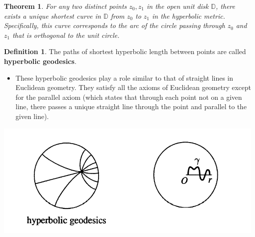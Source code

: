 \documentclass[
]{book}
\providecommand{\tightlist}{%
  \setlength{\itemsep}{0pt}\setlength{\parskip}{0pt}}
\newtheorem{theorem}{Theorem}[chapter]
\theoremstyle{definition}
\newtheorem{definition}{Definition}[chapter]
\theoremstyle{definition}
\theoremstyle{definition}
\theoremstyle{definition}
\theoremstyle{remark}
\begin{document}
\begin{theorem}
\protect\hypertarget{thm:unnamed-chunk-37}{}\label{thm:unnamed-chunk-37}For any two distinct points \(z_0, z_1\) in the open unit disk \(\mathbb{D}\), there exists a unique shortest curve in \(\mathbb{D}\) from \(z_0\) to \(z_1\) in the hyperbolic metric. Specifically, this curve corresponds to the arc of the circle passing through \(z_0\) and \(z_1\) that is orthogonal to the unit circle.
\end{theorem}

\begin{definition}
\protect\hypertarget{def:unnamed-chunk-38}{}\label{def:unnamed-chunk-38}The paths of shortest hyperbolic length between points are called \textbf{hyperbolic geodesics}.
\end{definition}

\begin{itemize}
\tightlist
\item
  These hyperbolic geodesics play a role similar to that of straight lines in Euclidean geometry. They satisfy all the axioms of Euclidean geometry except for the parallel axiom (which states that through each point not on a given line, there passes a unique straight line through the point and parallel to the given line).
\end{itemize}

\includegraphics[width=11.5in]{figures/Riemann_Mapping_Therom/fig3}
\end{document}
